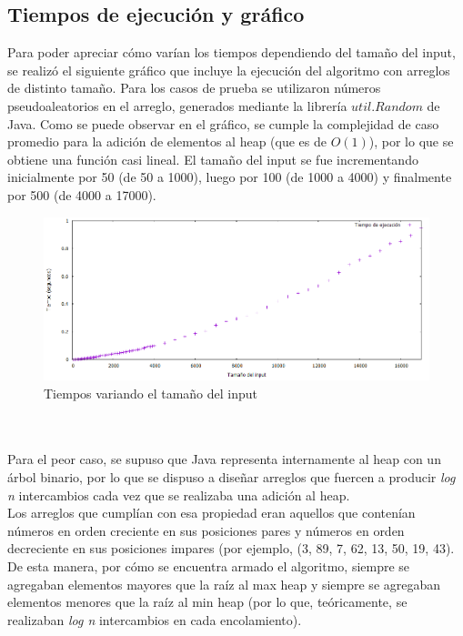\documentclass[10pt, a4paper]{article}
\begin{document}
	\subsection{Tiempos de ejecuci\'on y gr\'afico}
	Para poder apreciar c\'omo var\'ian los tiempos dependiendo del tamaño del input, se realiz\'o el siguiente gr\'afico que incluye la ejecuci\'on del algoritmo con arreglos de distinto tama\~no. Para los casos de prueba se utilizaron n\'umeros pseudoaleatorios en el arreglo, generados mediante la librer\'ia $util.Random$ de Java. Como se puede observar en el gr\'afico, se cumple la complejidad de caso promedio para la adici\'on de elementos al heap (que es de $O(1)$), por lo que se obtiene una funci\'on casi lineal. 
	El tama\~no del input se fue incrementando inicialmente por 50 (de 50 a 1000), luego por 100 (de 1000 a 4000) y finalmente por 500 (de 4000 a 17000).
	\begin{figure}
  		\centering
   	 	\includegraphics[width=1\textwidth]
   	 	{Imagenes/medianaTiempos.png}
		\caption{Tiempos variando el tama\~no del input}
	\end{figure}
	\\
	\newline
	\\Para el peor caso, se supuso que Java representa internamente al heap con un \'arbol binario, por lo que se dispuso a dise\~nar arreglos que fuercen a producir \textit{log n} intercambios cada vez que se realizaba una adici\'on al heap.
	\\Los arreglos que cumpl\'ian con esa propiedad eran aquellos que contenían n\'umeros en orden creciente en sus posiciones pares y n\'umeros en orden decreciente en sus posiciones impares (por ejemplo, (3, 89, 7, 62, 13, 50, 19, 43). De esta manera, por c\'omo se encuentra armado el algoritmo, siempre se agregaban elementos mayores que la ra\'iz al max heap y siempre se agregaban elementos menores que la ra\'iz al min heap (por lo que, te\'oricamente, se realizaban \textit{log n} intercambios en cada encolamiento).
\end{document}
